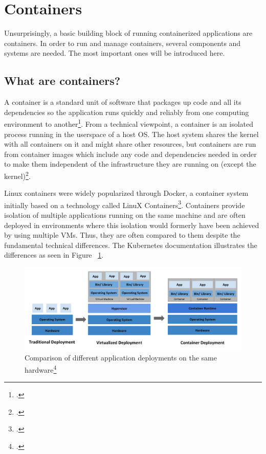 \section{Containers}

Unsurprisingly, a basic building block of running containerized applications are containers.
In order to run and manage containers, several components and systems are needed. The most important ones will be introduced here.

\subsection{What are containers?}
A container is a standard unit of software that packages up code and all its dependencies so the application runs quickly and reliably from one computing environment to another\footcite[][, section 'Package Software into Standardized Units for Development, Shipment and Deployment']{whatContainer}.
From a technical viewpoint, a container is an isolated process running in the userspace of a host OS. The host system shares the kernel with all containers on it and might share other resources, but containers are run from container images which include any code and dependencies needed in order to make them independent of the infrastructure they are running on (except the kernel)\footcite[][, slide 13]{containerIntro}.

Linux containers were widely popularized through Docker, a container system initially based on a technology called LinuX Containers\footcite[][, section '2013: Docker']{containerHistory}.
Containers provide isolation of multiple applications running on the same machine and are often deployed in environments where this isolation would formerly have been achieved by using multiple VMs. Thus, they are often compared to them despite the fundamental technical differences. The Kubernetes documentation illustrates the differences as seen in Figure ~\ref{fig:VMsVsContainers}.

\begin{figure}[H]
\centering
\includegraphics[scale=0.3]{pictures/VMsVsContainers.jpg}
\caption{Comparison of different application deployments on the same hardware\protect\footcite[][, section 'Going back in time']{k8sBasics}}
\label{fig:VMsVsContainers}
\end{figure}

